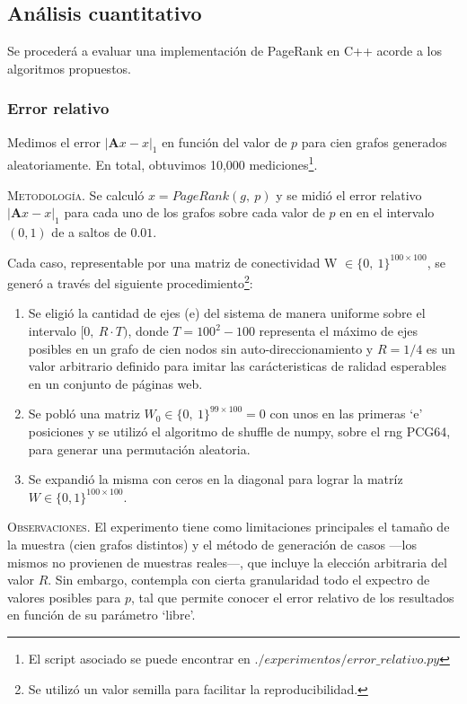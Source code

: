 \newpage
\subsection{Análisis cuantitativo} Se procederá a evaluar una implementación de PageRank en C++ acorde a los algoritmos propuestos.

\vspace{2em}
\subsubsection{Error relativo} Medimos el error $|\mathbf{A}x - x|_1$ en función del valor de $p$ para cien grafos generados aleatoriamente. En total, obtuvimos 10,000 mediciones\footnote{El script asociado se puede encontrar en $./experimentos/error\_relativo.py$}.  
\vspace{1em}

\noindent \textsc{Metodología}. Se calculó  $x = PageRank(g,\ p)$ y se midió el error relativo $|\mathbf{A}x - x|_1$ para cada uno de los grafos sobre cada valor de $p$ en en el intervalo $(0, 1)$ de a saltos de $0.01$.
\vspace{1em}

\noindent Cada caso, representable por una matriz de conectividad W $\in \{0,\ 1\}^{100 \times 100}$, se generó a través del siguiente procedimiento\footnote{Se utilizó un valor semilla para facilitar la reproducibilidad.}:
\vspace{1em}

\begin{enumerate}
    \item Se eligió  la cantidad de ejes (e) del sistema de manera uniforme sobre el intervalo $[0,\ R \cdot T)$, donde $T = 100^2 - 100$ representa el máximo de ejes posibles en un grafo de cien nodos sin auto-direccionamiento y $R = 1/4$ es un valor arbitrario definido para imitar las carácteristicas de ralidad esperables en un conjunto de páginas web.
    \item Se pobló una matriz $W_0 \in \{0,\ 1\}^{99 \times 100} = 0$ con unos en las primeras `e' posiciones y se utilizó el algoritmo de shuffle de numpy, sobre el rng \textsc{PCG64}, para generar una permutación aleatoria.
    \item Se expandió la misma con ceros en la diagonal para lograr la matríz $W \in \{0, 1\}^{100 \times 100}$. 
\end{enumerate}
\vspace{1em}


\noindent \textsc{Observaciones}. El experimento tiene como limitaciones principales el tamaño de la muestra (cien grafos distintos) y el método de generación de casos ---los mismos no provienen de muestras reales---, que incluye la elección arbitraria del valor $R$. Sin embargo, contempla con cierta granularidad todo el expectro de valores posibles para $p$, tal que permite conocer el error relativo de los resultados en función de su parámetro `libre'.
\vspace{1em}


